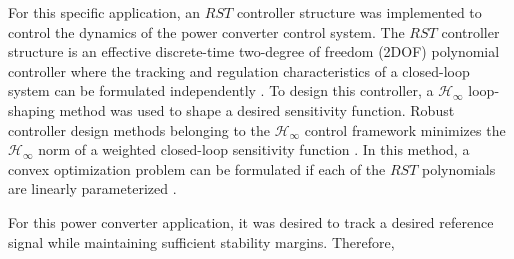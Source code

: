 \documentclass[11pt,english]{article}
\begin{document}
For this specific application, an $RST$ controller structure was implemented to control the dynamics of the power converter control system. The $RST$ controller structure is an effective discrete-time two-degree of freedom (2DOF) polynomial controller where the tracking and regulation characteristics of a closed-loop system can be formulated independently \cite{LZ06}. To design this controller, a $\mathcal{H}_\infty$ loop-shaping method was used to shape a desired sensitivity function. Robust controller design methods belonging to the $\mathcal{H}_{\infty}$ control framework minimizes the $\mathcal{H}_{\infty}$ norm of a weighted closed-loop sensitivity function \cite{ZD98}. In this method, a convex optimization problem can be formulated if each of the $RST$ polynomials are linearly parameterized \cite{NEK15}. 

For this power converter application, it was desired to track a desired reference signal while maintaining sufficient stability margins. Therefore, 


\end{document}
